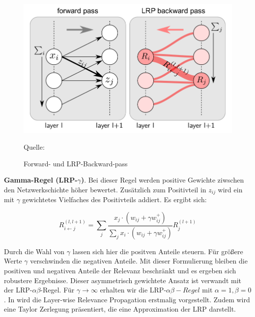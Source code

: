 \documentclass[11pt,a4paper]{article}
\newcommand{\source}[1]{\caption*{\hfill Quelle: {#1}} }
\numberwithin{equation}{section}
\begin{document}
	\begin{figure}[ht]
		\centering
		\includegraphics[width=0.3\textheight]{LRP_scheme.png}
		\caption[LRP-Schema]{Forward- und LRP-Backward-pass}
		\source{\cite{Lapuschkin2019OpeningTM}}
		\label{im:lrp_schema}
	\end{figure}
	
	\textbf{Gamma-Regel (LRP-$\gamma$)}. Bei dieser Regel werden positive Gewichte ziwschen den Netzwerkschichte höher bewertet. Zusätzlich zum Positivteil in $z_{ij}$ wird ein mit $\gamma$ gewichtetes Vielfaches des Positivteils addiert. Es ergibt sich:
	
	\begin{equation}
		R_{i\leftarrow j}^{(l,l+1)} = \sum_j{\frac{x_j \cdot (w_{ij}+ \gamma w_{ij}^+)}{\sum_j{x_i \cdot (w_{ij} + \gamma w_{ij}^+)}}R_j^{(l+1)}}
	\end{equation}
	
	Durch die Wahl von $\gamma$ lassen sich hier die positven Anteile steuern. Für größere Werte $\gamma$ verschwinden die negativen Anteile. Mit dieser Formulierung bleiben die positiven und negativen Anteile der Relevanz beschränkt und es ergeben sich robustere Ergebnisse. Dieser asymmetrisch gewichtete Ansatz ist verwandt mit der LRP-$\alpha\beta$-Regel. Für $\gamma \to \infty$ erhalten wir die LRP-$\alpha \beta-Regel$ mit $\alpha=1,\beta=0$.
	In \cite{LRP_first_paper} wird die Layer-wise Relevance Propagation erstmalig vorgestellt. Zudem wird eine Taylor Zerlegung präsentiert, die eine Approximation der LRP darstellt. 
	
\end{document}
